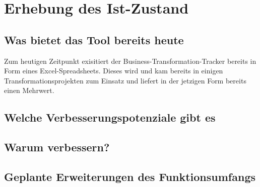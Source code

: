 \section{Erhebung des Ist-Zustand}

\subsection{Was bietet das Tool bereits heute}
Zum heutigen Zeitpunkt exisitiert der Business-Transformation-Tracker bereits in Form eines Excel-Spreadsheets. Dieses wird und kam bereits in einigen Transformationsprojekten zum Einsatz und liefert in der jetzigen Form bereits einen Mehrwert.
\subsection{Welche Verbesserungspotenziale gibt es}

\subsection{Warum verbessern?}

\subsection{Geplante Erweiterungen des Funktionsumfangs}
